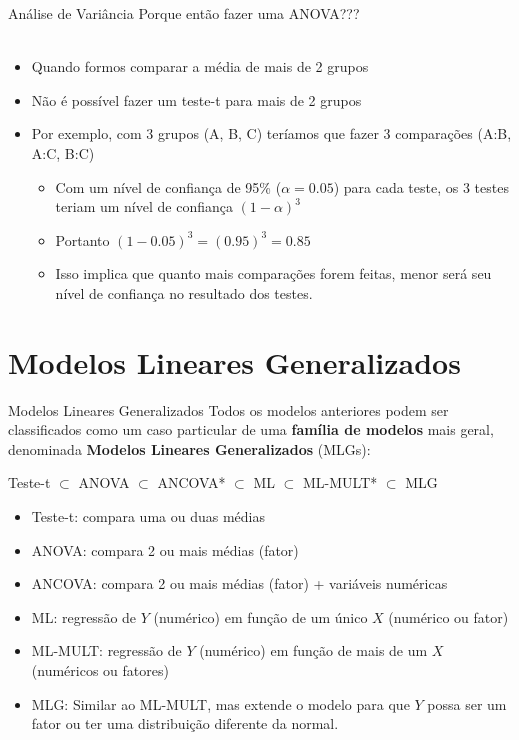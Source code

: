 \documentclass[10pt]{beamer}\usepackage[]{graphicx}\usepackage[]{color}
\theoremstyle{definition}
\begin{document}
\begin{frame}[fragile]{Análise de Variância}
Porque então fazer uma ANOVA??? \\~\\
\begin{itemize}
\item Quando formos comparar a média de mais de 2 grupos
\item Não é possível fazer um teste-t para mais de 2 grupos
\item Por exemplo, com 3 grupos (A, B, C) teríamos que fazer 3
  comparações (A:B, A:C, B:C)
  \begin{itemize}
  \item Com um nível de confiança de 95\% ($\alpha = 0.05$)
    para cada teste, os 3 testes teriam um nível de confiança
    $(1-\alpha)^3$
  \item Portanto $(1-0.05)^3 = (0.95)^3 = 0.85$
  \item Isso implica que quanto mais comparações forem feitas, menor
    será seu nível de confiança no resultado dos testes.
  \end{itemize}
\end{itemize}
\end{frame}

\section[MLGs]{Modelos Lineares Generalizados}

\begin{frame}[fragile]{Modelos Lineares Generalizados}
  Todos os modelos anteriores podem ser classificados como um caso
  particular de uma \textbf{família de modelos} mais geral, denominada
  \textbf{Modelos Lineares Generalizados} (MLGs):
  \begin{center}
    Teste-t $\subset$ ANOVA $\subset$ ANCOVA* $\subset$ ML $\subset$
    ML-MULT* $\subset$ MLG
  \end{center}
  \begin{itemize}
  \item Teste-t: compara uma ou duas médias
  \item ANOVA: compara 2 ou mais médias (fator)
  \item ANCOVA: compara 2 ou mais médias (fator) + variáveis numéricas
  \item ML: regressão de $Y$ (numérico) em função de um único $X$
    (numérico ou fator)
  \item ML-MULT: regressão de $Y$ (numérico) em função de mais de um $X$
    (numéricos ou fatores)
  \item MLG: Similar ao ML-MULT, mas extende o modelo para que $Y$ possa
    ser um fator ou ter uma distribuição diferente da normal.
  \end{itemize}
\end{frame}
\end{document}
